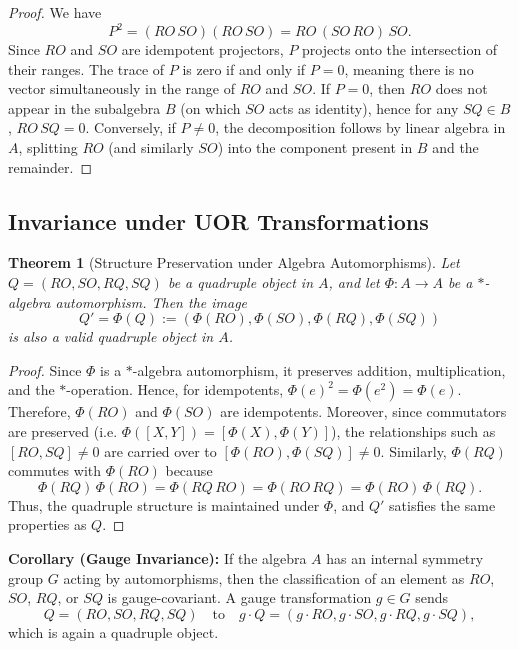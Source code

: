 \documentclass[12pt]{article}
\newtheorem{theorem}{Theorem}[section]
\begin{document}
\begin{proof}
We have 
\[
P^2 = (RO\,SO)(RO\,SO) = RO\,(SO\,RO)\,SO.
\]
Since $RO$ and $SO$ are idempotent projectors, $P$ projects onto the intersection of their ranges. The trace of $P$ is zero if and only if $P=0$, meaning there is no vector simultaneously in the range of $RO$ and $SO$. If $P=0$, then $RO$ does not appear in the subalgebra $B$ (on which $SO$ acts as identity), hence for any $SQ \in B$, $RO\,SQ = 0$. Conversely, if $P\neq 0$, the decomposition follows by linear algebra in $A$, splitting $RO$ (and similarly $SO$) into the component present in $B$ and the remainder.
\end{proof}

\subsection{Invariance under UOR Transformations}

\begin{theorem}[Structure Preservation under Algebra Automorphisms]
Let $Q = (RO,SO,RQ,SQ)$ be a quadruple object in $A$, and let $\Phi: A \to A$ be a $*$-algebra automorphism. Then the image 
\[
Q' = \Phi(Q) := (\Phi(RO), \Phi(SO), \Phi(RQ), \Phi(SQ))
\]
is also a valid quadruple object in $A$.
\end{theorem}

\begin{proof}
Since $\Phi$ is a $*$-algebra automorphism, it preserves addition, multiplication, and the $*$-operation. Hence, for idempotents, $\Phi(e)^2 = \Phi(e^2) = \Phi(e)$. Therefore, $\Phi(RO)$ and $\Phi(SO)$ are idempotents. Moreover, since commutators are preserved (i.e. $\Phi([X,Y]) = [\Phi(X),\Phi(Y)]$), the relationships such as $[RO,SQ]\neq 0$ are carried over to $[\Phi(RO),\Phi(SQ)] \neq 0$. Similarly, $\Phi(RQ)$ commutes with $\Phi(RO)$ because 
\[
\Phi(RQ)\,\Phi(RO) = \Phi(RQ\,RO) = \Phi(RO\,RQ) = \Phi(RO)\,\Phi(RQ).
\]
Thus, the quadruple structure is maintained under $\Phi$, and $Q'$ satisfies the same properties as $Q$.
\end{proof}

\textbf{Corollary (Gauge Invariance):} If the algebra $A$ has an internal symmetry group $G$ acting by automorphisms, then the classification of an element as $RO$, $SO$, $RQ$, or $SQ$ is gauge-covariant. A gauge transformation $g \in G$ sends 
\[
Q=(RO,SO,RQ,SQ) \quad \text{to} \quad g \cdot Q = (g\cdot RO, g\cdot SO, g\cdot RQ, g\cdot SQ),
\]
which is again a quadruple object.
\end{document}
